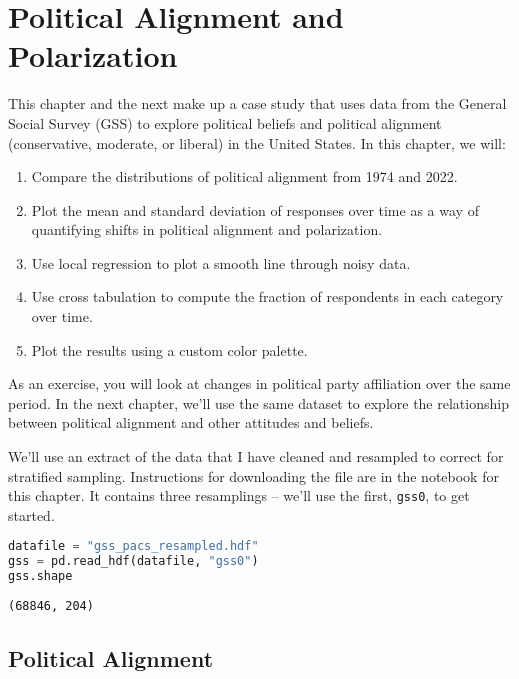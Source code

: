 \hypertarget{political-alignment-and-polarization}{%
\chapter{Political Alignment and
Polarization}\label{political-alignment-and-polarization}}

This chapter and the next make up a case study that uses data from the
General Social Survey (GSS) to explore political beliefs and political
alignment (conservative, moderate, or liberal) in the United States. In
this chapter, we will:

\begin{enumerate}
\def\labelenumi{\arabic{enumi}.}
\item
  Compare the distributions of political alignment from 1974 and 2022.
\item
  Plot the mean and standard deviation of responses over time as a way
  of quantifying shifts in political alignment and polarization.
\item
  Use local regression to plot a smooth line through noisy data.
\item
  Use cross tabulation to compute the fraction of respondents in each
  category over time.
\item
  Plot the results using a custom color palette.
\end{enumerate}

As an exercise, you will look at changes in political party affiliation
over the same period. In the next chapter, we'll use the same dataset to
explore the relationship between political alignment and other attitudes
and beliefs.

We'll use an extract of the data that I have cleaned and resampled to
correct for stratified sampling. Instructions for downloading the file
are in the notebook for this chapter. It contains three resamplings --
we'll use the first, \passthrough{\lstinline!gss0!}, to get started.

\begin{lstlisting}[language=Python,style=source]
datafile = "gss_pacs_resampled.hdf"
gss = pd.read_hdf(datafile, "gss0")
gss.shape
\end{lstlisting}

\begin{lstlisting}[style=output]
(68846, 204)
\end{lstlisting}

\hypertarget{political-alignment}{%
\section{Political Alignment}\label{political-alignment}}


